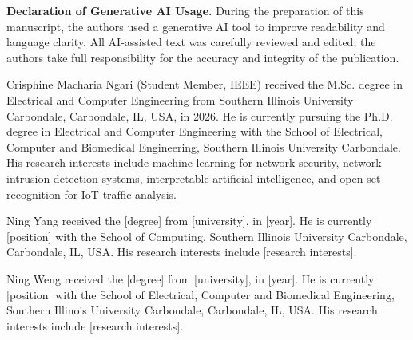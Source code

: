 \documentclass[journal]{IEEEtran}
\begin{document}
\begin{flushleft}
\small\textbf{Declaration of Generative AI Usage.}
During the preparation of this manuscript, the authors used a
generative AI tool to improve readability and language clarity. All
AI-assisted text was carefully reviewed and edited; the authors take
full responsibility for the accuracy and integrity of the publication.
\end{flushleft}




\begin{IEEEbiographynophoto}{Crisphine Macharia Ngari}
(Student Member, IEEE) received the M.Sc. degree in Electrical and Computer
Engineering from Southern Illinois University Carbondale, Carbondale, IL,
USA, in 2026. He is currently pursuing the Ph.D. degree in Electrical and
Computer Engineering with the School of Electrical, Computer and Biomedical
Engineering, Southern Illinois University Carbondale. His research interests
include machine learning for network security, network intrusion detection
systems, interpretable artificial intelligence, and open-set recognition for
IoT traffic analysis.
\end{IEEEbiographynophoto}

\begin{IEEEbiographynophoto}{Ning Yang}
received the [degree] from [university], in [year].
He is currently [position] with the School of Computing,
Southern Illinois University Carbondale, Carbondale, IL, USA.
His research interests include [research interests].
\end{IEEEbiographynophoto}

\begin{IEEEbiographynophoto}{Ning Weng}
received the [degree] from [university], in [year].
He is currently [position] with the School of Electrical, Computer
and Biomedical Engineering, Southern Illinois University Carbondale,
Carbondale, IL, USA.
His research interests include [research interests].
\end{IEEEbiographynophoto}
\end{document}
